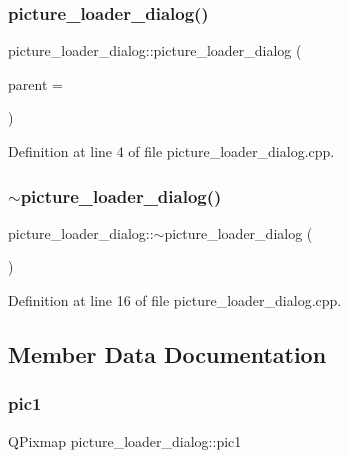 \subsubsection{\texorpdfstring{picture\+\_\+loader\+\_\+dialog()}{picture\_loader\_dialog()}}
{\footnotesize\ttfamily picture\+\_\+loader\+\_\+dialog\+::picture\+\_\+loader\+\_\+dialog (\begin{DoxyParamCaption}\item[{Q\+Widget $\ast$}]{parent = {} }\end{DoxyParamCaption})\hspace{0.3cm}{\ttfamily [explicit]}}



Definition at line 4 of file picture\+\_\+loader\+\_\+dialog.\+cpp.

\mbox{\label{classpicture__loader__dialog_a0d0f74bb2f6f60061b4216e8147fb227}} 
\subsubsection{\texorpdfstring{$\sim$picture\+\_\+loader\+\_\+dialog()}{~picture\_loader\_dialog()}}
{\footnotesize\ttfamily picture\+\_\+loader\+\_\+dialog\+::$\sim$picture\+\_\+loader\+\_\+dialog (\begin{DoxyParamCaption}{ }\end{DoxyParamCaption})}



Definition at line 16 of file picture\+\_\+loader\+\_\+dialog.\+cpp.



\subsection{Member Data Documentation}
\mbox{\label{classpicture__loader__dialog_a0b6814755183307c7639442c396ec625}} 
\subsubsection{\texorpdfstring{pic1}{pic1}}
{\footnotesize\ttfamily Q\+Pixmap picture\+\_\+loader\+\_\+dialog\+::pic1\hspace{0.3cm}{\ttfamily [private]}}



